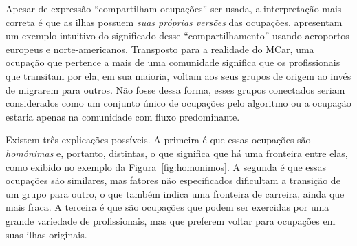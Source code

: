 \documentclass[12pt,a4paper]{article}
\begin{document}
Apesar de expressão \enquote{compartilham ocupações} ser usada, a interpretação mais correta é que as ilhas possuem \textit{suas próprias versões} das ocupações.  apresentam um exemplo intuitivo do significado desse \enquote{compartilhamento} usando aeroportos europeus e norte-americanos. Transposto para a realidade do MCar, uma ocupação que pertence a mais de uma comunidade significa que os profissionais que transitam por ela, em sua maioria, voltam aos seus grupos de origem ao invés de migrarem para outros. Não fosse dessa forma, esses grupos conectados seriam considerados como um conjunto único de ocupações pelo algoritmo ou a ocupação estaria apenas na comunidade com fluxo predominante.

Existem três explicações possíveis. A primeira é que essas ocupações são \textit{homônimas} e, portanto, distintas, o que significa que há uma fronteira entre elas, como exibido no exemplo da Figura~\ref{fig:homonimos}. A segunda é que essas ocupações são similares, mas fatores não especificados dificultam a transição de um grupo para outro, o que também indica uma fronteira de carreira, ainda que mais fraca. A terceira é que são ocupações que podem ser exercidas por uma grande variedade de profissionais, mas que preferem voltar para ocupações em suas ilhas originais.
\end{document}
